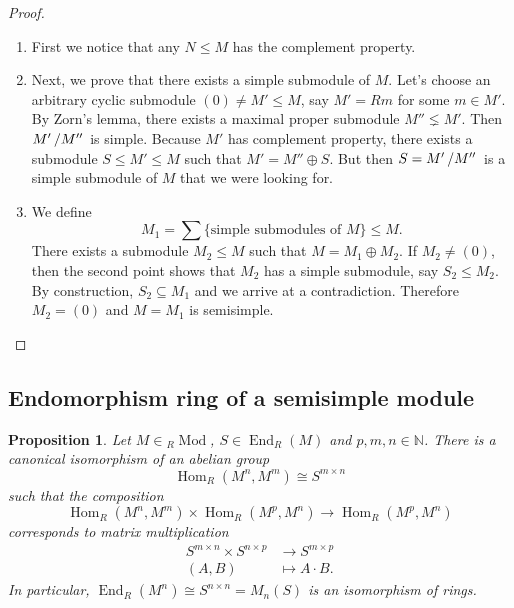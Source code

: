 \documentclass[10pt, a4paper]{article}
\newtheorem{proposition}[thm]{Proposition}
\newenvironment{noticeC}{%
  \tcolorbox[%
  notitle,
  empty,
  enhanced,  %
  breakable,
  coltext=black, 
  fontupper=\rmfamily,
  noparskip,
  sharp corners,
  boxrule=-1pt,  %
  frame hidden,
  left=7pt,  %
  right=7pt,
  top=5pt,
  bottom=5pt,
  before skip=2.5ex plus 2pt,
  after skip=2.5ex plus 2pt,
  overlay unbroken and last={%
  },
  ]}
{\endtcolorbox}
\newenvironment{myproof}%
  {\begin{noticeC}\begin{proof}}%
  {\end{proof}\end{noticeC}}
\newcommand{\N}{\mathbb {N}}
\newcommand{\quot}[2]{{\raisebox{0em}{$#1$}\left/\raisebox{0em}{$#2$}\right.}}
\DeclareMathOperator{\en}{End}
\DeclareMathOperator{\ho}{Hom}
\DeclareMathOperator{\mo}{Mod}
\begin{document}
\begin{myproof}
  \begin{enumerate}
    \item First we notice that any $N \leq M$ has the complement property.
    \item Next, we prove that there exists a simple submodule of $M$.
    Let's choose an arbitrary cyclic submodule $(0) \neq M' \leq M$, say $M' = Rm$ for some $m \in M'$.
    By Zorn's lemma, there exists a maximal proper submodule $M'' \lneq M'$.
    Then $\quot{M'}{M''}$ is simple. Because $M'$ has complement property, there 
    exists a submodule $S \leq M' \leq M$ such that $M' = M'' \oplus S$.
    But then $S = \quot{M'}{M''}$ is a simple submodule of $M$ that we were looking for.
    \item We define 
    $$M_1 = \sum \{\textrm{simple submodules of $M$}\} \leq M.$$
    There exists a submodule $M_2 \leq M$ such that $M = M_1 \oplus M_2$.
    If $M_2 \neq (0)$, then the second point shows that $M_2$ has a simple submodule, say $S_2 \leq M_2$.
    By construction, $S_2 \subseteq M_1$ and we arrive at a contradiction.
    Therefore $M_2 = (0)$ and $M = M_1$ is semisimple. \qedhere
  \end{enumerate}
\end{myproof}

\subsection{Endomorphism ring of a semisimple module}

\begin{proposition}
  Let $M \in {}_R \mo$, $S \in \en_R (M)$ and $p, m, n \in \N$.
  There is a canonical isomorphism of an abelian group
  $$\ho _R (M^n, M^m) \cong S^{m \times n}$$
  such that the composition 
  $$\ho_R (M^n, M^m) \times \ho_R (M^p, M^n) \to \ho_R (M^p, M^n)$$
  corresponds to matrix multiplication 
  \begin{align*}
    S^{m \times n} \times S^{n \times p} &\to S^{m \times p}\\
    (A, B) &\mapsto A \cdot B.
  \end{align*}
  In particular, $\en_R (M^n) \cong S^{n \times n} = M_n (S)$ is an isomorphism of rings.
\end{proposition}
\end{document}
